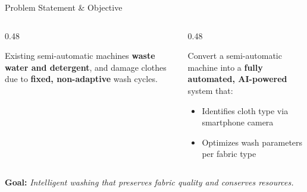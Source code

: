 \documentclass[aspectratio=169]{beamer}
\begin{document}
\begin{frame}{Problem Statement \& Objective}
\begin{columns}[T]
\begin{column}{0.48\textwidth}
\begin{tcolorbox}[mycard,
  title={\faExclamationTriangle\enspace Problem}]
\small
Existing semi-automatic machines \textbf{waste water and detergent}, and damage clothes due to \textbf{fixed, non-adaptive} wash cycles.
\end{tcolorbox}
\end{column}
\begin{column}{0.48\textwidth}
\begin{tcolorbox}[accentcard,
  title={\faBullseye\enspace Objective}]
\small
Convert a semi-automatic machine into a \textbf{fully automated, AI-powered} system that:
\begin{itemize}
  \item Identifies cloth type via smartphone camera
  \item Optimizes wash parameters per fabric type
\end{itemize}
\end{tcolorbox}
\end{column}
\end{columns}
\vspace{0.35cm}
\begin{tcolorbox}[goalbar]
\centering\small
\textcolor{NavyBlue}{\faStar\enspace\textbf{Goal:}}
\emph{Intelligent washing that preserves fabric quality and conserves resources.}
\end{tcolorbox}
\end{frame}
\end{document}
